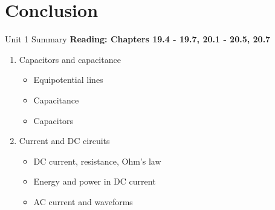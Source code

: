 \documentclass{beamer}
\begin{document}
\section{Conclusion}

\begin{frame}{Unit 1 Summary}
\textbf{Reading: Chapters 19.4 - 19.7, 20.1 - 20.5, 20.7}
\begin{enumerate}
\item Capacitors and capacitance
\begin{itemize}
\item Equipotential lines
\item Capacitance
\item Capacitors
\end{itemize}
\item Current and DC circuits
\begin{itemize}
\item DC current, resistance, Ohm's law
\item Energy and power in DC current
\item AC current and waveforms
\end{itemize}
\end{enumerate}
\end{frame}
\end{document}
